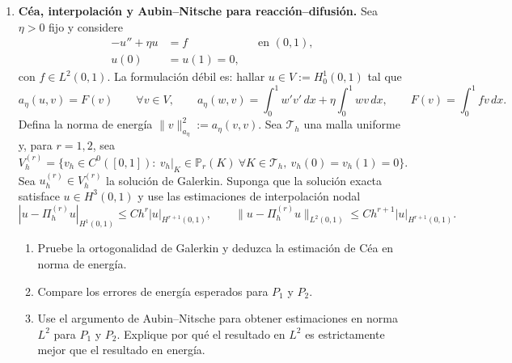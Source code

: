\documentclass[11pt]{article}
\theoremstyle{thmstyle}
\begin{document}
\begin{enumerate}[label=\textbf{\arabic*.}, leftmargin=*]

    \item \textbf{C\'ea, interpolaci\'on y Aubin--Nitsche para reacci\'on--difusi\'on.} Sea $\eta>0$ fijo y considere
    \begin{equation*}
    \begin{aligned}
        -u''+\eta u &= f &&\text{en }(0,1),\\
        u(0)&=u(1)=0,
    \end{aligned}
    \end{equation*}
    con $f\in L^2(0,1)$. La formulaci\'on d\'ebil es: hallar $u\in V:=H^1_0(0,1)$ tal que
    \begin{equation*}
        a_\eta(u,v)=F(v)\qquad \forall v\in V,
        \qquad
        a_\eta(w,v)=\int_0^1 w'v'\,dx+\eta\int_0^1wv\,dx,
        \qquad
        F(v)=\int_0^1fv\,dx.
    \end{equation*}
    Defina la norma de energ\'ia $\|v\|_{a_\eta}^2:=a_\eta(v,v)$. Sea $\mathcal T_h$ una malla uniforme y, para $r=1,2$, sea
    \begin{equation*}
        V_h^{(r)}=\{v_h\in C^0([0,1]):\ v_h|_K\in\mathbb P_r(K)\ \forall K\in\mathcal T_h,\ v_h(0)=v_h(1)=0\}.
    \end{equation*}
    Sea $u_h^{(r)}\in V_h^{(r)}$ la soluci\'on de Galerkin. Suponga que la soluci\'on exacta satisface $u\in H^3(0,1)$ y use las estimaciones de interpolaci\'on nodal
    \begin{equation*}
        |u-\Pi_h^{(r)}u|_{H^1(0,1)}\le Ch^r|u|_{H^{r+1}(0,1)},
        \qquad
        \|u-\Pi_h^{(r)}u\|_{L^2(0,1)}\le Ch^{r+1}|u|_{H^{r+1}(0,1)}.
    \end{equation*}
    \begin{enumerate}[label=(\alph*)]
        \item Pruebe la ortogonalidad de Galerkin y deduzca la estimaci\'on de C\'ea en norma de energ\'ia.
        \item Compare los errores de energ\'ia esperados para $P_1$ y $P_2$.
        \item Use el argumento de Aubin--Nitsche para obtener estimaciones en norma $L^2$ para $P_1$ y $P_2$. Explique por qu\'e el resultado en $L^2$ es estrictamente mejor que el resultado en energ\'ia.
    \end{enumerate}


\end{enumerate}
\end{document}
